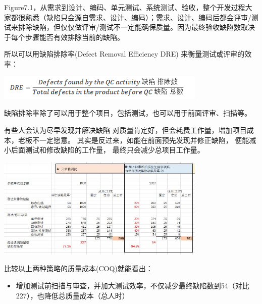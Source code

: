 Figure7.1，从需求到设计、编码、单元测试、系统测试、验收，整个开发过程大家都很熟悉（缺陷只会源自需求、设计、编码）；需求、设计、编码后都会评审/测试来排除缺陷，但仅仅做评审/测试不一定能确保质量。因为最终验收缺陷数取决于每个步骤能否有效排除当前的缺陷。

所以可以用缺陷排除率(Defect Removal Efficiency DRE)
来衡量测试或评审的效率：


\includegraphics[width=10cm]{Ma310.png}

缺陷排除率除了可以用于整个项目，包括测试，也可以用于前面评审、扫描等。

\begin{description}
\item[]
\begin{description}
\tightlist
\item[]
= = =
\end{description}
\end{description}

有些人会认为尽早发现并解决缺陷
对质量肯定好，但会耗费工作量，增加项目成本，老板不一定愿意。
其实是反过来，如能在前面预先发现并修正缺陷，
便能减小后面测试和修改缺陷的工作量， 最终只会减少总项目工作量。


\includegraphics[width=10cm]{AR1FixVarCostScreenshot20221210144400.jpg}

比较以上两种策略的质量成本(COQ)就能看出：

\begin{itemize}
\tightlist
\item
  增加测试前扫描与审查，并加大测试效率，不仅减少最终缺陷数到54（对比227），也降低总质量成本（总人时）
\end{itemize}

